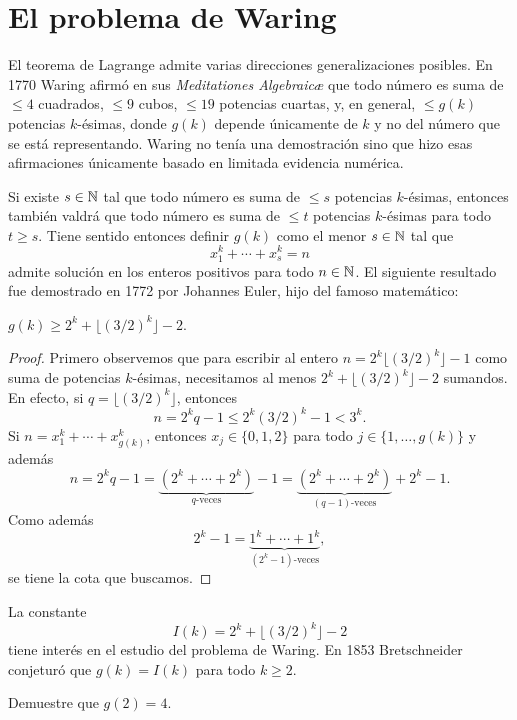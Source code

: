 \section*{El problema de Waring}

El teorema de Lagrange admite varias direcciones generalizaciones posibles. En
1770 Waring afirmó en sus \emph{Meditationes Algebraic\ae} que todo número es
suma de $\leq 4$ cuadrados, $\leq 9$ cubos, $\leq 19$ potencias cuartas, y, en
general, $\leq g(k)$ potencias $k$-ésimas, donde $g(k)$ depende únicamente de
$k$ y no del número que se está representando. Waring no tenía una demostración
sino que hizo esas afirmaciones únicamente basado en limitada evidencia
numérica. 

Si existe $s\in\mathbb{N}$ tal que todo número es suma de $\leq s$ potencias
$k$-ésimas, entonces también valdrá que todo número es suma de $\leq t$
potencias $k$-ésimas para todo $t\geq s$. Tiene sentido entonces definir $g(k)$
como el menor $s\in\mathbb{N}$ tal que 
\[
	x_1^k+\cdots+x_s^k=n
\]
admite solución en los enteros positivos para todo $n\in\mathbb{N}$. El siguiente
resultado fue demostrado en 1772 por Johannes Euler, hijo del famoso
matemático: 

\begin{theorem}[Euler]
	$g(k)\geq 2^k+\lfloor (3/2)^k\rfloor-2$. 
\end{theorem}

\begin{proof}
	Primero observemos que para escribir al entero $n=2^k\lfloor
	(3/2)^k\rfloor-1$ como suma de potencias $k$-ésimas, necesitamos al menos
	$2^k+\lfloor (3/2)^k\rfloor-2$ sumandos. En efecto, si $q=\lfloor
	(3/2)^k\rfloor$, entonces
	\[
		n=2^kq-1\leq 2^k(3/2)^k-1<3^k.
	\]
	Si $n=x_1^k+\cdots+x_{g(k)}^k$, entonces $x_j\in\{0,1,2\}$ para todo
	$j\in\{1,\dots,g(k)\}$ y además 
	\[
		n=2^kq-1=\underbrace{(2^k+\cdots+2^k)}_{q\text{-veces}}-1=\underbrace{(2^k+\cdots+2^k)}_{(q-1)\text{-veces}}+2^k-1.
	\]
	Como además 
	\[
		2^k-1=\underbrace{1^k+\cdots+1^k}_{(2^k-1)\text{-veces}},
	\]
	se tiene la cota que buscamos.
\end{proof}

La constante 
\[
	I(k)=2^k+\lfloor (3/2)^k\rfloor-2 
\]
tiene interés en el estudio del problema de Waring. En 1853 Bretschneider
conjeturó que $g(k)=I(k)$ para todo $k\geq2$.

\begin{exercise}
	Demuestre que $g(2)=4$. 
\end{exercise}


